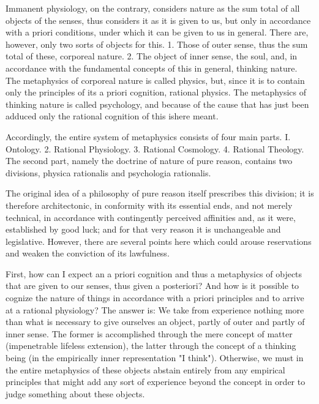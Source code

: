 \documentclass{article}
\begin{document}
Immanent physiology, on the contrary, considers nature as the sum
total of all objects of the senses, 
thus considers it as it is given to us,
but only in accordance with a priori conditions,
under which it can be given to us in general.
There are, however, only two sorts of objects for this.
1. Those of outer sense, thus the sum total of these, corporeal nature.
2. The object of inner sense, the soul,
and, in accordance with the fundamental concepts of this in general, thinking nature.
The metaphysics of corporeal nature is called physics,
but, since it is to contain only the principles
of its a priori cognition, rational physics.
The metaphysics of thinking nature is called psychology,
and because of the cause that has just been adduced
only the rational cognition of this ishere meant.

Accordingly, the entire system of metaphysics consists of four main parts.
I. Ontology. 2. Rational Physiology. 3. Rational Cosmology. 4. Rational Theology.
The second part, namely the doctrine of nature of pure reason,
contains two divisions, physica rationalis and psychologia rationalis.

The original idea of a philosophy of pure reason itself prescribes this division;
it is therefore architectonic, in conformity with its essential ends,
and not merely technical, in accordance with contingently perceived affinities
and, as it were, established by good luck;
and for that very reason it is unchangeable and legislative.
However, there are several points here which could arouse reservations
and weaken the conviction of its lawfulness.

First, how can I expect an a priori cognition and thus a metaphysics
of objects that are given to our senses, thus given a posteriori?
And how is it possible to cognize the nature of things
in accordance with a priori principles
and to arrive at a rational physiology? The answer is:
We take from experience nothing more than
what is necessary to give ourselves an object, 
partly of outer and partly of inner sense.
The former is accomplished through the mere concept of matter
(impenetrable lifeless extension),
the latter through the concept of a thinking being
(in the empirically inner representation "I think").
Otherwise, we must in the entire metaphysics of these objects
abstain entirely from any empirical principles
that might add any sort of experience beyond the concept
in order to judge something about these objects. 
\end{document}
